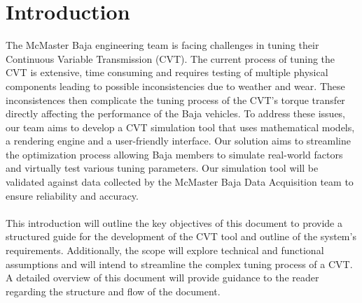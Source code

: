 \documentclass[12pt]{article}
\begin{document}





\section{Introduction}

The McMaster Baja engineering team is facing challenges in tuning their Continuous Variable Transmission (CVT). 
The current process of tuning the CVT is extensive, time consuming and requires testing of multiple physical components leading to possible inconsistencies due to weather and wear. 
These inconsistences then complicate the tuning process of the CVT’s torque transfer directly affecting the performance of the Baja vehicles. 
To address these issues, our team aims to develop a CVT simulation tool that uses mathematical models, a rendering engine and a user-friendly interface. 
Our solution aims to streamline the optimization process allowing Baja members to simulate real-world factors and virtually test various tuning parameters. 
Our simulation tool will be validated against data collected by the McMaster Baja Data Acquisition team to ensure reliability and accuracy.  
\\
\\
This introduction will outline the key objectives of this document to provide a structured guide for the development of the CVT tool and outline of the system’s requirements. 
Additionally, the scope will explore technical and functional assumptions and will intend to streamline the complex tuning process of a CVT. 
A detailed overview of this document will provide guidance to the reader regarding the structure and flow of the document. 
\end{document}
